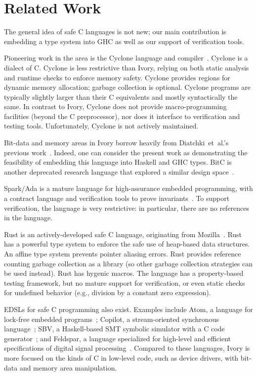 \section{Related Work}
\label{sec:related-work}

The general idea of safe C languages is not new; our main contribution is
embedding a type system into GHC as well as our support of verification
tools.

Pioneering work in the area is the Cyclone language and
compiler~\cite{cyclone}. Cyclone is a dialect of C. Cyclone is less restrictive than
Ivory, relying on both static analysis and runtime checks to enforce memory
safety. Cyclone provides regions for dynamic memory allocation; garbage
collection is optional. Cyclone programs are typically slightly larger than
their C equivalents and mostly syntactically the same. In contrast to Ivory,
Cyclone does not provide macro-programming facilities (beyond the C
preprocessor), nor does it interface to verification and testing
tools. Unfortunately, Cyclone is not actively maintained.

Bit-data and memory areas in Ivory borrow heavily from Diatchki~et~al.'s
previous work~\cite{high-level, memareas}. Indeed, one can consider the present
work as demonstrating the feasibility of embedding this language into Haskell
and GHC types. BitC is another deprecated research language that explored a
similar design space~\cite{bitc}.

Spark/Ada is a mature language for high-assurance embedded
programming, with a contract language and verification tools to
prove invariants~\cite{spark}. To support verification, the language is
very restrictive: in particular, there are no references in the language.

Rust is an actively-developed safe C language, originating from
Mozilla~\cite{rust}. Rust has a powerful type system to enforce the safe use of
heap-based data structures. An affine type system prevents pointer aliasing
errors. Rust provides reference counting garbage collection as a library (so
other garbage collection strategies can be used instead). Rust has hygenic
macros. The language has a property-based testing framework, but no mature
support for verification, or even static checks for undefined behavior (e.g.,
division by a constant zero expression).

EDSLs for safe C programming also exist. Examples include Atom, a language for
lock-free embedded programs~\cite{atom}; Copilot, a stream-oriented synchronous
language~\cite{copilot}; SBV, a Haskell-based SMT symbolic simulator with a C code
generator~\cite{sbv}; and Feldspar, a language specialized for high-level and
efficient specifications of digital signal processing~\cite{feldspar1}. Compared to these
languages, Ivory is more focused on the kinds of C in low-level code, such as
device drivers, with bit-data and memory area manipulation.
